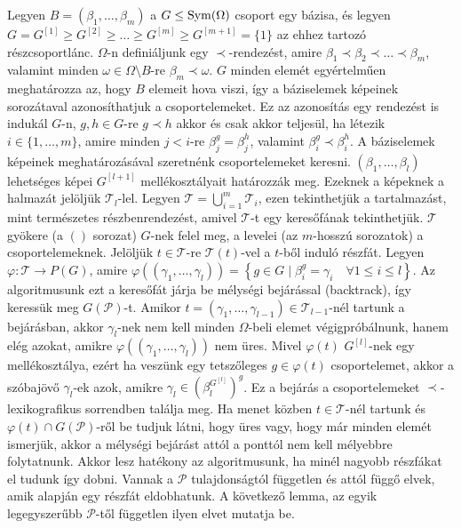 Legyen $B=(\beta_1,\dots,\beta_m)$ a $G \le \operatorname{Sym}(\Omega)$ csoport egy bázisa, és legyen $G = G^{[1]} \ge G^{[2]} \ge \dots \ge G^{[m]} \ge G^{[m+1]} = \{1\}$ az ehhez tartozó részcsoportlánc.
$\Omega$-n definiáljunk egy $\prec$-rendezést, amire $\beta_1 \prec \beta_2 \prec \dots \prec \beta_m$, valamint minden $\omega \in \Omega \setminus B$-re $\beta_m \prec \omega$.
$G$ minden elemét egyértelműen meghatározza az, hogy $B$ elemeit hova viszi, így a báziselemek képeinek sorozátaval azonosíthatjuk a csoportelemeket.
Ez az azonosítás egy rendezést is indukál $G$-n, $g, h \in G$-re $g \prec h$ akkor és csak akkor teljesül, ha létezik $i \in \{1,\dots,m\}$, amire minden $j < i$-re $\beta_j^g = \beta_j^h$, valamint $\beta_i^g \prec \beta_i^h$.
A báziselemek képeinek meghatározásával szeretnénk csoportelemeket keresni.
$(\beta_1,\dots,\beta_l)$ lehetséges képei $G^{[l+1]}$ mellékosztályait határozzák meg.
Ezeknek a képeknek a halmazát jelöljük $\mathcal{T}_l$-lel.
Legyen $\mathcal{T} = \bigcup_{i=1}^m \mathcal{T}_i$, ezen tekinthetjük a tartalmazást, mint természetes részbenrendezést, amivel $\mathcal{T}$-t egy keresőfának tekinthetjük.
$\mathcal{T}$ gyökere (a $()$ sorozat) $G$-nek felel meg, a levelei (az $m$-hosszú sorozatok) a csoportelemeknek.
Jelöljük $t \in \mathcal{T}$-re $\mathcal{T}(t)$-vel a $t$-ből induló részfát.
Legyen $\varphi : \mathcal{T} \to P(G)$, amire $\varphi((\gamma_1,\dots,\gamma_l)) = \left\{ g \in G \mid \beta_i^g = \gamma_i \quad \forall 1 \le i \le l \right \}$.
Az algoritmusunk ezt a keresőfát járja be mélységi bejárással (backtrack), így keressük meg $G(\mathcal{P})$-t.
Amikor $t = (\gamma_1,\dots,\gamma_{l-1}) \in \mathcal{T}_{l-1}$-nél tartunk a bejárásban, akkor $\gamma_l$-nek nem kell minden $\Omega$-beli elemet végigpróbálnunk,
hanem elég azokat, amikre $\varphi((\gamma_1,\dots,\gamma_l))$ nem üres.
Mivel $\varphi(t)$ $G^{[l]}$-nek egy mellékosztálya, ezért ha veszünk egy tetszőleges $g \in \varphi(t)$ csoportelemet, akkor a szóbajövő $\gamma_l$-ek
azok, amikre $\gamma_l \in (\beta_l^{G^{[l]}})^g$.
Ez a bejárás a csoportelemeket $\prec$-lexikografikus sorrendben találja meg.
Ha menet közben $t \in \mathcal{T}$-nél tartunk és $\varphi(t) \cap G(\mathcal{P})$-ről be tudjuk látni, hogy üres vagy, hogy már minden elemét ismerjük, akkor a mélységi bejárást attól a ponttól nem kell mélyebbre folytatnunk.
Akkor lesz hatékony az algoritmusunk, ha minél nagyobb részfákat el tudunk így dobni.
Vannak a $\mathcal{P}$ tulajdonságtól független és attól függő elvek, amik alapján egy részfát eldobhatunk.
A következő lemma, az egyik legegyszerűbb $\mathcal{P}$-től független ilyen elvet mutatja be.
